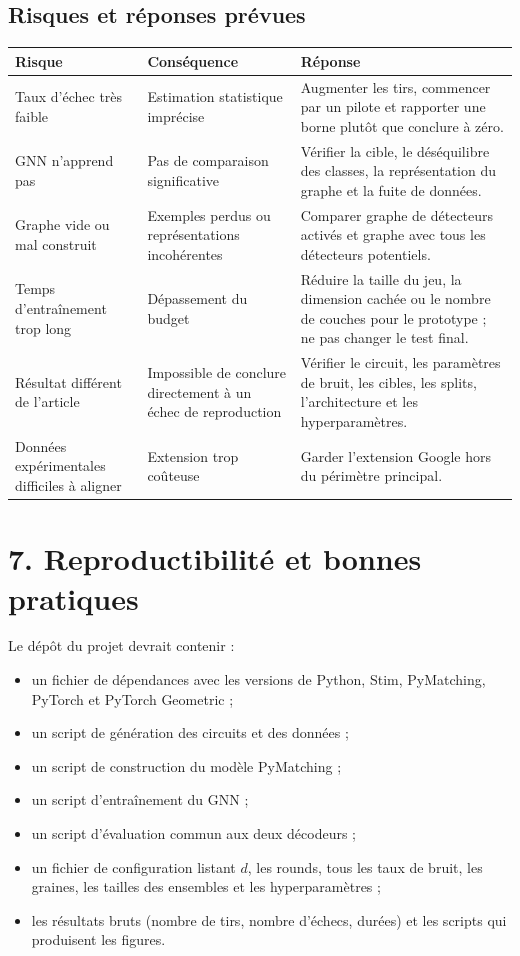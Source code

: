 \documentclass[11pt,a4paper]{article}
\begin{document}
\subsection{Risques et réponses prévues}

\begin{longtable}{p{4cm} p{5.5cm} p{5cm}}
\toprule
Risque & Conséquence & Réponse \\
\midrule
Taux d'échec très faible & Estimation statistique imprécise & Augmenter les tirs, commencer par un pilote et rapporter une borne plutôt que conclure à zéro. \\
GNN n'apprend pas & Pas de comparaison significative & Vérifier la cible, le déséquilibre des classes, la représentation du graphe et la fuite de données. \\
Graphe vide ou mal construit & Exemples perdus ou représentations incohérentes & Comparer graphe de détecteurs activés et graphe avec tous les détecteurs potentiels. \\
Temps d'entraînement trop long & Dépassement du budget & Réduire la taille du jeu, la dimension cachée ou le nombre de couches pour le prototype ; ne pas changer le test final. \\
Résultat différent de l'article & Impossible de conclure directement à un échec de reproduction & Vérifier le circuit, les paramètres de bruit, les cibles, les splits, l'architecture et les hyperparamètres. \\
Données expérimentales difficiles à aligner & Extension trop coûteuse & Garder l'extension Google hors du périmètre principal. \\
\bottomrule
\end{longtable}

\section{7. Reproductibilité et bonnes pratiques}

Le dépôt du projet devrait contenir :
\begin{itemize}
 \item un fichier de dépendances avec les versions de Python, Stim,
 PyMatching, PyTorch et PyTorch Geometric ;
 \item un script de génération des circuits et des données ;
 \item un script de construction du modèle PyMatching ;
 \item un script d'entraînement du GNN ;
 \item un script d'évaluation commun aux deux décodeurs ;
 \item un fichier de configuration listant $d$, les rounds, tous les taux
 de bruit, les graines, les tailles des ensembles et les hyperparamètres ;
 \item les résultats bruts (nombre de tirs, nombre d'échecs, durées) et les
 scripts qui produisent les figures.
\end{itemize}
\end{document}
